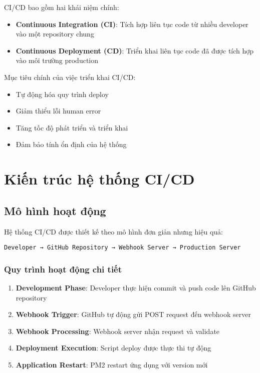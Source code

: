 \documentclass[12pt,a4paper]{article}
\begin{document}
CI/CD bao gồm hai khái niệm chính:
\begin{itemize}
    \item \textbf{Continuous Integration (CI)}: Tích hợp liên tục code từ nhiều developer vào một repository chung
    \item \textbf{Continuous Deployment (CD)}: Triển khai liên tục code đã được tích hợp vào môi trường production
\end{itemize}

Mục tiêu chính của việc triển khai CI/CD:
\begin{itemize}
    \item Tự động hóa quy trình deploy
    \item Giảm thiểu lỗi human error
    \item Tăng tốc độ phát triển và triển khai
    \item Đảm bảo tính ổn định của hệ thống
\end{itemize}

\section{Kiến trúc hệ thống CI/CD}

\subsection{Mô hình hoạt động}

Hệ thống CI/CD được thiết kế theo mô hình đơn giản nhưng hiệu quả:

\begin{center}
\texttt{Developer → GitHub Repository → Webhook Server → Production Server}
\end{center}

\subsubsection{Quy trình hoạt động chi tiết}

\begin{enumerate}
    \item \textbf{Development Phase}: Developer thực hiện commit và push code lên GitHub repository
    \item \textbf{Webhook Trigger}: GitHub tự động gửi POST request đến webhook server
    \item \textbf{Webhook Processing}: Webhook server nhận request và validate
    \item \textbf{Deployment Execution}: Script deploy được thực thi tự động
    \item \textbf{Application Restart}: PM2 restart ứng dụng với version mới
\end{enumerate}
\end{document}
